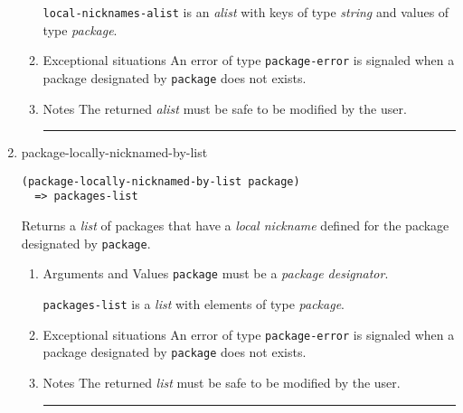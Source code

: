 \documentclass[11pt]{article}
\begin{document}
\begin{enumerate}
\begin{enumerate}
\texttt{local-nicknames-alist} is an \emph{alist} with keys of type \emph{string} and
values of type \emph{package}.
\item Exceptional situations
\label{sec:orged07e5b}
An error of type \texttt{package-error} is signaled when a package designated by
\texttt{package} does not exists.
\item Notes
\label{sec:org7367c7e}
The returned \emph{alist} must be safe to be modified by the user.

\noindent\rule{\textwidth}{0.5pt}
\end{enumerate}
\item package-locally-nicknamed-by-list
\label{sec:org11eb340}
\begin{verbatim}
(package-locally-nicknamed-by-list package)
  => packages-list
\end{verbatim}

Returns a \emph{list} of packages that have a \emph{local nickname} defined for the
package designated by \texttt{package}.
\begin{enumerate}
\item Arguments and Values
\label{sec:org7dbf7ac}
\texttt{package} must be a \emph{package designator}.

\texttt{packages-list} is a \emph{list} with elements of type \emph{package}.
\item Exceptional situations
\label{sec:orgeb2ceba}
An error of type \texttt{package-error} is signaled when a package designated by
\texttt{package} does not exists.
\item Notes
\label{sec:org549b58b}
The returned \emph{list} must be safe to be modified by the user.

\noindent\rule{\textwidth}{0.5pt}
\end{enumerate}
\end{enumerate}
\end{document}

